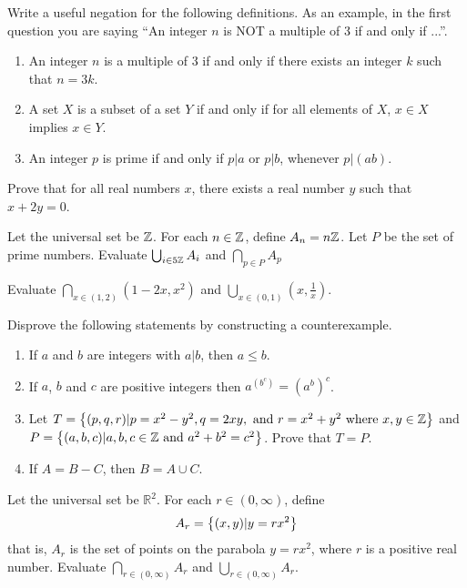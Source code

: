 \documentclass[12pt]{article}
\begin{document}
\begin{qu}
Write a useful negation for the following definitions. As an example, in the first question you are saying ``An integer $n$ is NOT a multiple of 3 if and only if ...''.
\begin{enumerate}[label=\alph*)]
\item An integer $n$ is a multiple of 3 if and only if there exists an integer $k$ such that $n=3k$.
\item A set $X$ is a subset of a set $Y$ if and only if for all elements of $X$, $x \in X$ implies $x \in Y$.
\item An integer $p$ is prime if and only if $p|a$ or $p|b$, whenever $p|(ab)$.
\end{enumerate}
\end{qu}

\begin{qu}
Prove that for all real numbers $x$, there exists a real number $y$ such that $x+2y=0$.
\end{qu}

\begin{qu}
Let the universal set be $\mathbb Z$. For each $n \in \mathbb Z$, define $A_n= n\mathbb Z$. Let $P$ be the set of prime numbers. Evaluate $\bigcup_{i \in 5\mathbb Z} A_i$ and $\bigcap_{p \in P} A_p$
\end{qu}

\begin{qu}
Evaluate $\bigcap_{x\in (1,2)} (1-2x, x^2)$ and $\bigcup_{x\in (0,1)} (x, \frac{1}{x})$.
\end{qu}

\begin{qu}
Disprove the following statements by constructing a counterexample.
\begin{enumerate}[label=\alph*)]
\item If $a$ and $b$ are integers with $a|b$, then $a\leq b$.
\item If $a$, $b$ and $c$ are positive integers then $a^{(b^c)}=(a^b)^c$.
\item Let $ T = \left\{ (p, q, r) | p=x^2-y^2, q=2xy, \textrm{ and } r=x^2+y^2 \textrm{ where } x, y \in \mathbb{Z} \right\}$ and $P=\left\{ (a,b,c) | a,b,c \in \mathbb{Z} \textrm{ and } a^2+b^2=c^2 \right\}$. Prove that $T = P$.
\item If $A=B-C$, then $B=A\cup C$.
\end{enumerate}
\end{qu}



\begin{qu}
Let the universal set be $\mathbb{R}^2$. For each $r \in (0, \infty)$, define
$$A_r=\left\{(x,y)| y=rx^2\right\}$$
that is, $A_r$ is the set of points on the parabola $y=rx^2$, where $r$ is a positive real number. Evaluate
$ \bigcap_{r\in (0, \infty)} A_r $ and $ \bigcup_{r\in (0, \infty)} A_r $.
\end{qu}
\end{document}
